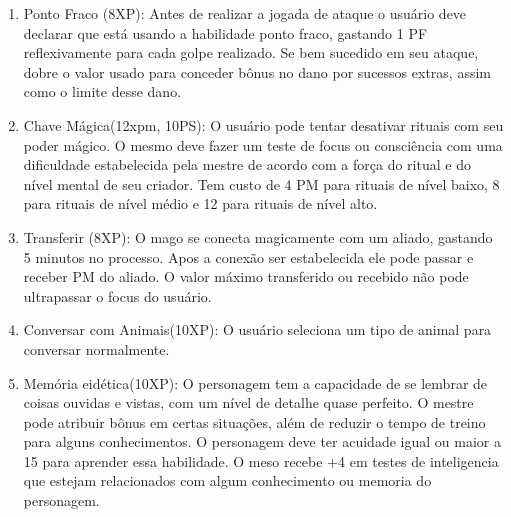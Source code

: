 \begin{enumerate}
	\item Ponto Fraco (8XP): Antes de realizar a jogada de ataque o usuário deve declarar que está usando a habilidade ponto fraco, gastando 1 PF reflexivamente para cada golpe realizado. Se bem sucedido em seu ataque, dobre o valor usado para conceder bônus no dano por sucessos extras, assim como o limite desse dano.
	
	\item  Chave Mágica(12xpm, 10PS): O usuário pode tentar desativar rituais com seu poder mágico. O mesmo deve fazer um teste de focus ou consciência com uma dificuldade estabelecida pela mestre de acordo com a força do ritual e do nível mental de seu criador. Tem custo de 4 PM para rituais de nível baixo, 8 para rituais de nível médio e 12 para rituais de nível alto.
	
	\item Transferir (8XP): O mago se conecta magicamente com um aliado, gastando 5 minutos no processo. Apos a conexão ser estabelecida ele pode passar e receber PM do aliado. O valor máximo transferido ou recebido não pode ultrapassar o focus do usuário.

 	\item Conversar com Animais(10XP): O usuário seleciona um tipo de animal para conversar normalmente. 

	\item Memória eidética(10XP): O personagem tem a capacidade de se lembrar de coisas ouvidas e vistas, com um nível de detalhe quase perfeito. O mestre pode atribuir bônus em certas situações, além de reduzir o tempo de treino para alguns conhecimentos. O personagem deve ter acuidade igual ou maior a 15 para aprender essa habilidade. O meso recebe +4 em testes de inteligencia que estejam relacionados com algum conhecimento ou memoria do personagem.

	
	

\end{enumerate}
